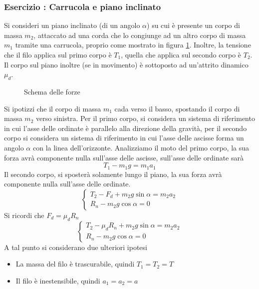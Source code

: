 \documentclass[10pt, letterpaper]{report}
\begin{document}
\subsubsection{Esercizio : Carrucola e piano inclinato}
Si consideri un piano inclinato (di un angolo $\alpha$) su cui è presente un corpo di massa 
$m_2$, attaccato ad una corda che lo congiunge ad un altro corpo di massa $m_1$ tramite una 
carrucola, proprio come mostrato in figura \ref{fig:carrucola}. Inoltre, la tensione che il filo applica 
sul primo corpo è $T_1$, quella che applica sul secondo corpo è $T_2$. Il corpo sul piano inoltre (se in movimento) 
è sottoposto ad un'attrito dinamico $\mu_d$.\acc 
\begin{figure}[h]
    \caption{Schema delle forze}
    \label{fig:carrucola}
\end{figure}
Si ipotizzi che il corpo di massa $m_1$ cada verso il basso, spostando il corpo di massa $m_2$ verso sinistra.
Per il primo corpo, si considera un sistema di riferimento in cui l'asse delle ordinate è parallelo alla 
direzione della gravità, per il secondo corpo si considera un sistema di riferimento in cui 
l'asse delle ascisse forma un angolo $\alpha$ con la linea dell'orizzonte. \acc 
Analizziamo il moto del primo corpo, la sua forza avrà componente nulla sull'asse 
delle ascisse, sull'asse delle ordinate sarà 
$$ T_1-m_1g=m_1a_1$$
Il secondo corpo, si sposterà solamente lungo il piano, la sua forza avrà componente nulla sull'asse 
delle ordinate. 
$$\begin{cases}
    T_2-F_d+m_2g\sin\alpha=m_2a_2 \\ 
    R_n-m_2g\cos\alpha = 0
\end{cases}$$
Si ricordi che $F_d=\mu_dR_n$
$$\begin{cases}
    T_2-\mu_dR_n+m_2g\sin\alpha=m_2a_2 \\ 
    R_n-m_2g\cos\alpha = 0
\end{cases}$$
A tal punto si considerano due ulteriori ipotesi\begin{itemize}
    \item La massa del filo è trascurabile, quindi $T_1=T_2=T$ 
    \item Il filo è inestensibile, quindi $a_1=a_2=a$
\end{itemize}
\end{document}
